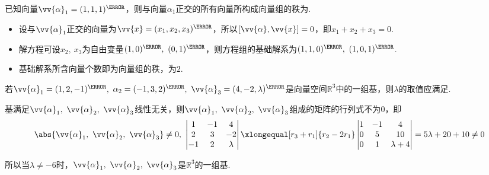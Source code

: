 \begin{problem}
    已知向量$\vv{\alpha}_1=(1,1,1)^\T$，则与向量$\alpha_1$正交的所有向量所构成向量组的秩为.
\end{problem}
\begin{solution}
\begin{itemize}
    \item 设与$\vv{\alpha}_1$正交的向量为$\vv{x}=(x_1,x_2,x_3)^\T$，所以$[\vv{\alpha},\vv{x}]=0$，即$x_1+x_2+x_3=0$.
    \item 解方程可设$x_2,\ x_3$为自由变量$(1,0)^\T,\ (0,1)^\T$，则方程组的基础解系为$(1,1,0)^\T,\ (1,0,1)^\T$.
    \item 基础解系所含向量个数即为向量组的秩，为$2$.
\end{itemize}
\end{solution}

\begin{problem}
    若$\vv{\alpha}_1=(1,2,-1)^\T,\ \alpha_2=(-1,3,2)^\T,\ \vv{\alpha}_3=(4,-2,\lambda)^\T$是向量空间$\mathbb{R}^3$中的一组基，则$\lambda$的取值应满足.
\end{problem}
\begin{solution}
    基满足$\vv{\alpha}_1,\ \vv{\alpha}_2,\ \vv{\alpha}_3$线性无关，则$\vv{\alpha}_1,\ \vv{\alpha}_2,\ \vv{\alpha}_3$组成的矩阵的行列式不为$0$，即
    \[\abs{\vv{\alpha}_1,\ \vv{\alpha}_2,\ \vv{\alpha}_3}\neq 0,\ 
    \begin{vmatrix}
        1 & -1 & 4\\
        2 & 3 & -2\\
        -1 & 2 & \lambda
    \end{vmatrix}\xlongequal[r_3+r_1]{r_2-2r_1}
    \begin{vmatrix}
        1 & -1 & 4\\
        0 & 5 & 10\\
        0 & 1 & \lambda+4
    \end{vmatrix}=5\lambda+20+10\neq 0\]

所以当$\lambda\neq -6$时，$\vv{\alpha}_1,\ \vv{\alpha}_2,\ \vv{\alpha}_3$是$\mathbb{R}^3$的一组基.
\end{solution}

